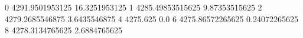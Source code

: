 0 4291.9501953125 16.3251953125
1 4285.49853515625 9.87353515625
2 4279.2685546875 3.6435546875
4 4275.625 0.0
6 4275.86572265625 0.24072265625
8 4278.3134765625 2.6884765625
